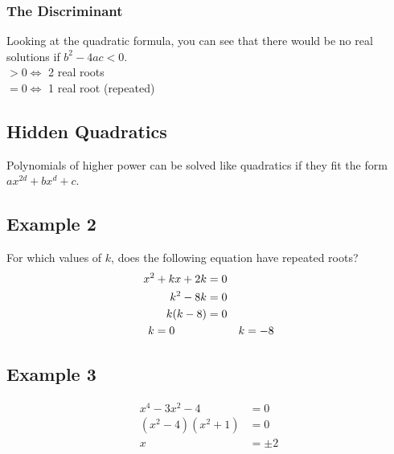 \documentclass[class=article, crop=false]{standalone}
\begin{document}
\subsubsection*{The Discriminant}
Looking at the quadratic formula, you can see that there would be no real solutions if $b^2 -4ac < 0$. \\
$> 0 \iff$ 2 real roots \\
$= 0 \iff$ 1 real root (repeated) \\
\subsection*{Hidden Quadratics}
Polynomials of higher power can be solved like quadratics if they fit the form $ax^{2d} + bx^{d} + c$.
\subsection*{Example 2}
For which values of $k$, does the following equation have repeated roots? \\
\begin{align*}
x^2 + kx + 2k & = 0 \\
k^2 - 8k & = 0 \\
k(k - 8) & = 0 \\
k = 0 \hspace*{1cm} & \hspace*{1cm} k = -8
\end{align*}
\subsection*{Example 3}
\begin{align*}
x^4 - 3x^2 - 4 & = 0 \\
(x^2 - 4)(x^2 + 1)& = 0 \\
x & = \pm 2 \\
\end{align*}
\end{document}
